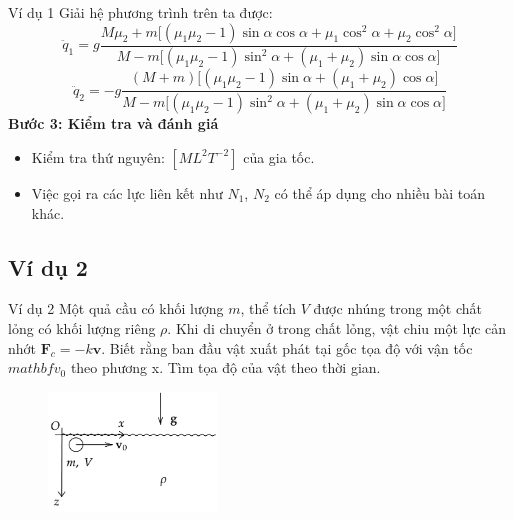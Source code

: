 \begin{frame}{Ví dụ 1}
    Giải hệ phương trình trên ta được:
    \begin{equation*}
    \ddot q_1 =g
\frac{
M\mu_2
+m\Big[(\mu_1 \mu_2 -1)\sin\alpha\cos\alpha
+\mu_1\cos^2\alpha
+\mu_2\cos^2\alpha
\Big]
}
{M - m\Big[(\mu_1\mu_2 -1)\sin^2\alpha
+(\mu_1+\mu_2)\sin\alpha\cos\alpha
\Big]}
    \end{equation*}
    \begin{equation*}
        \ddot q_2 =
-g\frac{(M+m)\Big[
(\mu_1\mu_2 -1)\sin\alpha
+(\mu_1 +\mu_2)\cos\alpha
\Big]}
{M - m\Big[(\mu_1\mu_2 -1)\sin^2\alpha
+(\mu_1+\mu_2)\sin\alpha\cos\alpha
\Big]}
    \end{equation*}
\textbf{Bước 3: Kiểm tra và đánh giá}
\begin{itemize}
    \item Kiểm tra thứ nguyên: \([ML^2T^{-2}]\) của gia tốc.
    \item Việc gọi ra các lực liên kết như \(N_1\), \(N_2\) có thể áp dụng cho nhiều bài toán khác.
\end{itemize}
\end{frame}

\subsection{Ví dụ 2}
\begin{frame}{Ví dụ 2}
    Một quả cầu có khối lượng \(m\), thể tích \(V\) được nhúng trong một chất lỏng có khối lượng riêng \(\rho\). Khi di chuyển ở trong chất lỏng, vật chiu một lực cản nhớt \(\mathbf F_c=-k\mathbf v\). Biết rằng ban đầu vật xuất phát tại gốc tọa độ với vận tốc \(mathbf v_0\) theo phương x. Tìm tọa độ của vật theo thời gian.
\begin{figure}
    \centering
    \includegraphics[width=0.4\textwidth]{Slides/Figure/masatnhot.png}
\end{figure}
\end{frame}

